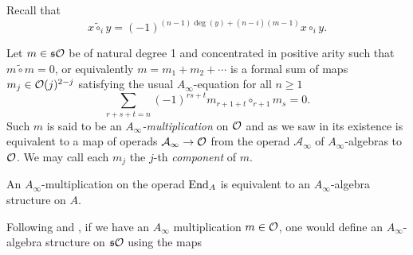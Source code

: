 \documentclass[join.tex]{subfiles}
\begin{document}
Recall that 
\[x\tilde{\circ}_iy=(-1)^{(n-1)\deg(y)+(n-i)(m-1)}x\circ_i y.\]


\begin{defin}
Let $m\in\mathfrak{s}{\mathcal O}$ be of natural degree 1 and concentrated in positive arity such that $m\tilde{\circ}m=0$, or equivalently $m=m_1+m_2+\cdots$ is a formal sum of maps $m_j\in{\mathcal O}(j)^{2-j}$ satisfying the usual $A_\infty$-equation for all $n\geq 1$
\begin{equation}\label{Ainftyeq}
\sum_{r+s+t=n}(-1)^{rs+t}m_{r+1+t}\circ_{r+1}m_s=0.
\end{equation} 
Such $m$ is said to be an \emph{$A_\infty$-multiplication} on ${\mathcal O}$ and as we saw in  its existence is equivalent to a map of operads $\mathcal{A}_\infty\to {\mathcal O}$ from the operad $\mathcal{A}_\infty$ of $A_\infty$-algebras to ${\mathcal O}$. We may call each $m_j$ the $j$-th \emph{component} of $m$.
\end{defin}

\begin{remark}\label{multiplicationalgebra}
An $A_\infty$-multiplication on the operad $\operatorname{End}_A$ is equivalent to an $A_\infty$-algebra structure on $A$.
\end{remark}

Following \cite{GV} and \cite{getzler}, if we have an $A_\infty$ multiplication $m\in{\mathcal O}$, one would define an $A_\infty$-algebra structure on $\mathfrak{s}{\mathcal O}$ using the maps 
\end{document}
